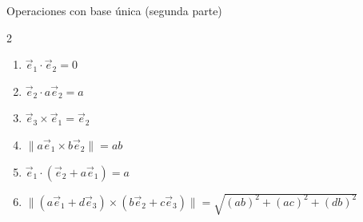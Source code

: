\begin{solucion}{Operaciones con base única (segunda parte)}
\begin{multicols}{2}
            
    \begin{enumerate}
        
    \item$\vec{e}_1\cdot\vec{e}_2=0$
    \item$\vec{e}_2\cdot a\vec{e}_2= a$
    \item$\vec{e}_3\times \vec{e}_1=\vec{e}_2$
    \item$\|a\vec{e}_1\times b\vec{e}_2\|=ab$
    \item$\vec{e}_1\cdot (\vec{e}_2+a\vec{e}_1 )=a$
    \item$\|(a\vec{e}_1+d\vec{e}_3)\times (b\vec{e}_2+c\vec{e}_3)\|=\sqrt{(ab)^2+(ac)^2+(db)^2}$
        \end{enumerate}
        \end{multicols}
\end{solucion}
